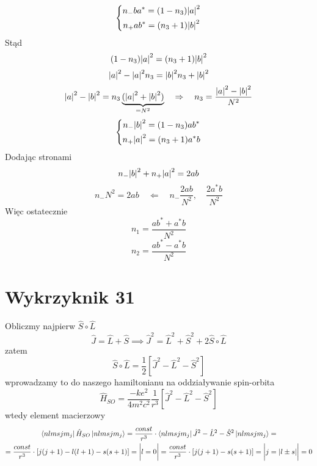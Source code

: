 \documentclass[a4paper,12pt]{article}
\begin{document}
\begin{equation*}
  \left\{\begin{gathered}
      n_{-} b a^* = (1-n_3)\abs{a}^2  \\
      n_{+} a b^*=  (n_3 +1) \abs{b}^2 
  \end{gathered}\right.
\end{equation*}
Stąd
\begin{equation*}
  (1-n_3)\abs{a}^2 =(n_3 +1) \abs{b}^2  
\end{equation*}
\begin{equation*}
  \abs{a}^2 - \abs{a}^2n_3 = \abs{b}^2n_3 + \abs{b}^2
\end{equation*}
\begin{equation*}
  \abs{a}^2 - \abs{b}^2 = n_3 \underbrace{(\abs{a}^2 + \abs{b}^2)}_{=N^2} \quad
  \Rightarrow \quad n_3 = \frac{\abs{a}^2 - \abs{b}^2 }{N^2}
\end{equation*}
\begin{equation*}
  \left\{\begin{gathered}
      n_{-} \abs{b}^2 = (1-n_3)ab^*  \\
      n_{+} \abs{a}^2=  (n_3 +1)a^*b
  \end{gathered}\right.
\end{equation*}
Dodając stronami
\begin{equation*}
  n_{-} \abs{b}^2 + n_{+} \abs{a}^2= 2ab
\end{equation*}
\begin{equation*}
  n_{-} N^2 = 2ab \quad \Leftarrow \quad n_{-} \frac{2ab}{N^2}, \quad
  \frac{2a^*b}{N^2}
\end{equation*}
Więc ostatecznie
\begin{equation*}
  n_1 = \frac{ab^* + a^*b}{N^2}
\end{equation*}
\begin{equation*}
  n_2 = \frac{ab^* - a^*b}{N^2}
\end{equation*}

\section{Wykrzyknik 31}
 	Obliczmy najpierw $\hat{S}\circ\hat{L}$ 
 		$$
 		\hat{J}= \hat{L}+\hat{S} \implies \hat{J}^2 = \hat{L}^2+\hat{S}^2 + 2\hat{S}\circ\hat{L}
 		$$
 	zatem
 		$$
 		\hat{S}\circ\hat{L}=\frac{1}{2}\left[\hat{J}^2-\hat{L}^2-\hat{S}^2 \right]
 		$$
 	wprowadzamy to do naszego hamiltonianu na oddziaływanie spin-orbita 
 		$$
 		\hat{H}_{SO} = \frac{-ke^2}{4m^2c^2}\frac{1}{r^3}\left[\hat{J}^2-\hat{L}^2-\hat{S}^2 \right]
 		$$
 	wtedy element macierzowy
 		$$
 		\begin{gathered}
 			\bra{nlmsjm_j}\hat{H}_{SO}\ket{nlmsjm_j} = \frac{const}{r^3}\cdot\bra{nlmsjm_j}\hat{J}^2-\hat{L}^2-\hat{S}^2\ket{nlmsjm_j} = \\ =\frac{const}{r^3}\cdot\left[j(j+1) - l(l+1)-s(s+1)\right] = \bigg\vert l = 0\bigg\vert = \frac{const}{r^3}\cdot\left[j(j+1) -s(s+1)\right] = \bigg\vert j = |l\pm s| \bigg\vert = 0
 		\end{gathered}
 		$$
\end{document}
